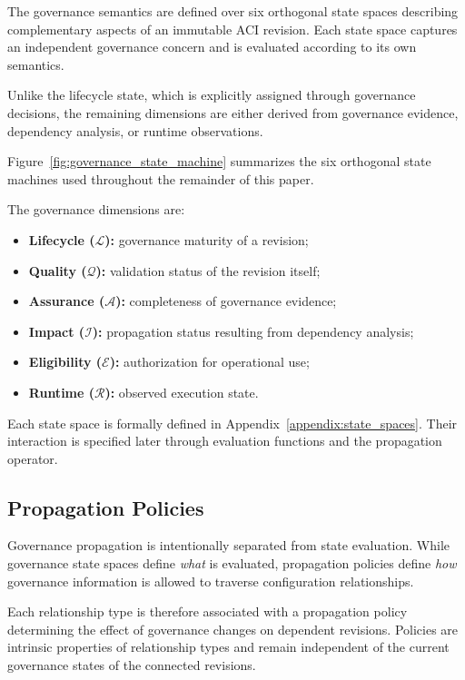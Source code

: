 \documentclass[10pt]{article}
\begin{document}
	The governance semantics are defined over six orthogonal state spaces describing complementary aspects of an immutable ACI revision. Each state space captures an independent governance concern and is evaluated according to its own semantics.
	
	Unlike the lifecycle state, which is explicitly assigned through governance decisions, the remaining dimensions are either derived from governance evidence, dependency analysis, or runtime observations.
	
	Figure~\ref{fig:governance_state_machine} summarizes the six orthogonal state machines used throughout the remainder of this paper.
	
	The governance dimensions are:
	
	\begin{itemize}
		\item \textbf{Lifecycle ($\mathcal{L}$):} governance maturity of a revision;
		\item \textbf{Quality ($\mathcal{Q}$):} validation status of the revision itself;
		\item \textbf{Assurance ($\mathcal{A}$):} completeness of governance evidence;
		\item \textbf{Impact ($\mathcal{I}$):} propagation status resulting from dependency analysis;
		\item \textbf{Eligibility ($\mathcal{E}$):} authorization for operational use;
		\item \textbf{Runtime ($\mathcal{R}$):} observed execution state.
	\end{itemize}
	
	Each state space is formally defined in Appendix~\ref{appendix:state_spaces}. Their interaction is specified later through evaluation functions and the propagation operator.
	
	\subsection{Propagation Policies}
	\label{sec:propagation_policies}
	
	Governance propagation is intentionally separated from state evaluation. While governance state spaces define \emph{what} is evaluated, propagation policies define \emph{how} governance information is allowed to traverse configuration relationships.
	
	Each relationship type is therefore associated with a propagation policy determining the effect of governance changes on dependent revisions. Policies are intrinsic properties of relationship types and remain independent of the current governance states of the connected revisions.
	
\end{document}

